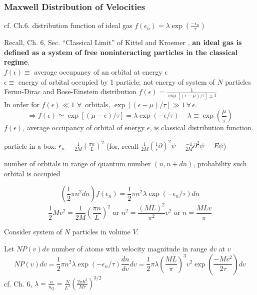 \documentclass[twoside]{amsart}
\theoremstyle{plain}
\theoremstyle{definition}
\begin{document}
\subsubsection*{Maxwell Distribution of Velocities}  

cf. Ch.6. distribution function of ideal gas $f(\epsilon_n) = \lambda \exp{ \left( \frac{-\epsilon_n}{\tau} \right)}$

Recall, Ch. 6, Sec. ``Classical Limit'' of Kittel and Kroemer \cite{CKittelHKroemer1980}, \textbf{an ideal gas is defined as a system of free noninteracting particles in the classical regime}.  \\
$f(\epsilon) \equiv $ average occupancy of an orbital at energy $\epsilon$ \\
$\epsilon \equiv $ energy of orbital occupied by 1 particle; not energy of system of $N$ particles \\
Fermi-Dirac and Bose-Einstein distribution $f(\epsilon) = \frac{1}{ \exp{ [ (\epsilon - \mu )/\tau ] } \pm 1 }$ \\
In order for $f(\epsilon) \ll 1$ $\forall \, $ orbitals, $\exp{ [ (\epsilon-\mu)/\tau ] } \gg 1\, \forall \, \epsilon$.  
\[
\Longrightarrow f(\epsilon) \simeq \exp{ [(\mu - \epsilon )/\tau]} = \lambda \exp{ (-\epsilon/\tau)} \quad \, \lambda \equiv \exp{ \left( \frac{ \mu }{\tau} \right) }
\]
$f(\epsilon)$, average occupancy of orbital of energy $\epsilon$, is classical distribution function.  

particle in a box: $\epsilon_n = \frac{1}{2M} \left( \frac{\pi n}{L} \right)^2 $ (for, recall $\frac{1}{2M} \left( \frac{1}{i} \partial \right)^2 \psi = \frac{-1}{2M} \partial^2 \psi = E \psi$)

number of orbitals in range of quantum number $(n,n+dn)$, probability such orbital is occupied

\[
(\frac{1}{2} \pi n^2 dn)f(\epsilon_n) = \frac{1}{2} \pi n^2 \lambda \exp{ (-\epsilon_n/\tau) } dn
\]
\[
\frac{1}{2} Mv^2 = \frac{1}{2M} \left( \frac{ \pi n}{ L } \right)^2 \text{ or } n^2 = \frac{ (ML)^2 }{ \pi^2} v^2 \text{ or } n = \frac{MLv}{\pi}
\]

Consider system of $N$ particles in volume $V$.  

Let $NP(v) dv$ number of atoms with velocity magnitude in range $dv$ at $v$
\[
NP(v) dv = \frac{1}{2} \pi n^2 \lambda \exp{ ( -\epsilon_n /\tau)} \frac{dn}{dv} dv = \frac{1}{2} \pi \lambda \left( \frac{ ML }{ \pi } \right)^3 v^2 \exp{ \left( \frac{ -Mv^2 }{2\tau } \right) }dv
\]
cf. Ch. 6, $\lambda = \frac{n}{n_Q} = \frac{N}{L^3} \left( \frac{ 2\pi \hbar^2 }{ M \tau } \right)^{3/2}$
\end{document}
